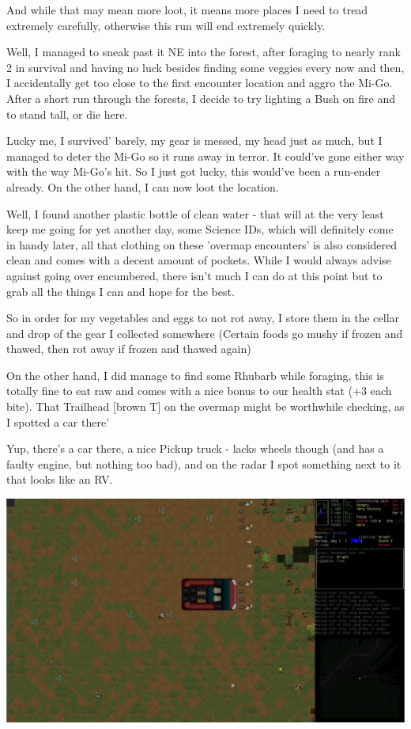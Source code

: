 \documentclass[11pt]{report}
\begin{document}
And while that may mean more loot, it means more places I need to tread extremely carefully, otherwise this run will end extremely quickly.

Well, I managed to sneak past it NE into the forest, after foraging to nearly rank 2 in survival and having no luck besides finding some veggies every now and then, I accidentally get too close to the first encounter location and aggro the Mi-Go. After a short run through the forests, I decide to try lighting a Bush on fire and to stand tall, or die here.

Lucky me, I survived' barely, my gear is messed, my head just as much, but I managed to deter the Mi-Go so it runs away in terror. It could've gone either way with the way Mi-Go's hit. So I just got lucky, this would've been a run-ender already. On the other hand, I can now loot the location.

Well, I found another plastic bottle of clean water - that will at the very least keep me going for yet another day, some Science IDs, which will definitely come in handy later, all that clothing on these 'overmap encounters' is also considered clean and comes with a decent amount of pockets. While I would always advise against going over encumbered, there isn't much I can do at this point but to grab all the things I can and hope for the best.

So in order for my vegetables and eggs to not rot away, I store them in the cellar and drop of the gear I collected somewhere (Certain foods go mushy if frozen and thawed, then rot away if frozen and thawed again)

On the other hand, I did manage to find some Rhubarb while foraging, this is totally fine to eat raw and comes with a nice bonus to our health stat (+3 each bite). That Trailhead [brown T] on the overmap might be worthwhile checking, as I spotted a car there'

Yup, there's a car there, a nice Pickup truck - lacks wheels though (and has a faulty engine, but nothing too bad), and on the radar I spot something next to it that looks like an RV.

\includegraphics[width=\textwidth]{10}
\end{document}
